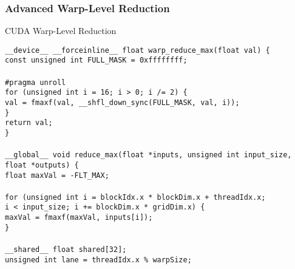 \documentclass[12pt,a4paper]{article}
\begin{document}
\subsubsection{Advanced Warp-Level Reduction}

\begin{algorithm}[H]
\caption{CUDA Warp-Level Reduction}
\label{alg:cuda_reduction}
\begin{flushleft}
\texttt{\_\_device\_\_ \_\_forceinline\_\_ float warp\_reduce\_max(float val) \{}\\
\hspace{1cm}\texttt{const unsigned int FULL\_MASK = 0xffffffff;}\\
\\
\hspace{1cm}\texttt{\#pragma unroll}\\
\hspace{1cm}\texttt{for (unsigned int i = 16; i > 0; i /= 2) \{}\\
\hspace{2cm}\texttt{val = fmaxf(val, \_\_shfl\_down\_sync(FULL\_MASK, val, i));}\\
\hspace{1cm}\texttt{\}}\\
\hspace{1cm}\texttt{return val;}\\
\texttt{\}}\\
\\
\texttt{\_\_global\_\_ void reduce\_max(float *inputs, unsigned int input\_size, float *outputs) \{}\\
\hspace{1cm}\texttt{float maxVal = -FLT\_MAX;}\\
\\
\hspace{1cm}\texttt{for (unsigned int i = blockIdx.x * blockDim.x + threadIdx.x;}\\
\hspace{2.5cm}\texttt{i < input\_size; i += blockDim.x * gridDim.x) \{}\\
\hspace{2cm}\texttt{maxVal = fmaxf(maxVal, inputs[i]);}\\
\hspace{1cm}\texttt{\}}\\
\\
\hspace{1cm}\texttt{\_\_shared\_\_ float shared[32];}\\
\hspace{1cm}\texttt{unsigned int lane = threadIdx.x \% warpSize;}\\

\end{flushleft}
\end{algorithm}
\end{document}
